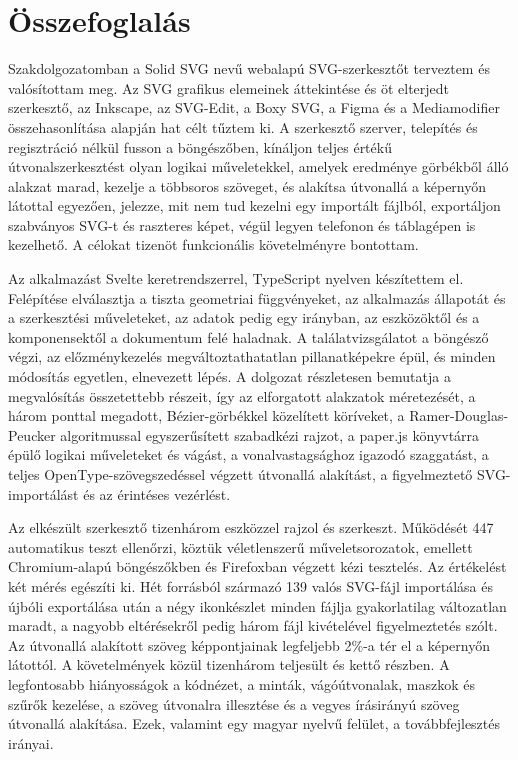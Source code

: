 \chapter{Összefoglalás}
\label{ch:summary}

Szakdolgozatomban a Solid SVG nevű webalapú SVG-szerkesztőt terveztem és valósítottam meg. Az SVG grafikus elemeinek áttekintése és öt elterjedt szerkesztő, az Inkscape, az SVG-Edit, a Boxy SVG, a Figma és a Mediamodifier összehasonlítása alapján hat célt tűztem ki. A szerkesztő szerver, telepítés és regisztráció nélkül fusson a böngészőben, kínáljon teljes értékű útvonalszerkesztést olyan logikai műveletekkel, amelyek eredménye görbékből álló alakzat marad, kezelje a többsoros szöveget, és alakítsa útvonallá a képernyőn látottal egyezően, jelezze, mit nem tud kezelni egy importált fájlból, exportáljon szabványos SVG-t és raszteres képet, végül legyen telefonon és táblagépen is kezelhető. A célokat tizenöt funkcionális követelményre bontottam.

Az alkalmazást Svelte keretrendszerrel, TypeScript nyelven készítettem el. Felépítése elválasztja a tiszta geometriai függvényeket, az alkalmazás állapotát és a szerkesztési műveleteket, az adatok pedig egy irányban, az eszközöktől és a komponensektől a dokumentum felé haladnak. A találatvizsgálatot a böngésző végzi, az előzménykezelés megváltoztathatatlan pillanatképekre épül, és minden módosítás egyetlen, elnevezett lépés. A dolgozat részletesen bemutatja a megvalósítás összetettebb részeit, így az elforgatott alakzatok méretezését, a három ponttal megadott, Bézier-görbékkel közelített köríveket, a Ramer-Douglas-Peucker algoritmussal egyszerűsített szabadkézi rajzot, a paper.js könyvtárra épülő logikai műveleteket és vágást, a vonalvastagsághoz igazodó szaggatást, a teljes OpenType-szövegszedéssel végzett útvonallá alakítást, a figyelmeztető SVG-importálást és az érintéses vezérlést.

Az elkészült szerkesztő tizenhárom eszközzel rajzol és szerkeszt. Működését 447 automatikus teszt ellenőrzi, köztük véletlenszerű műveletsorozatok, emellett Chromium-alapú böngészőkben és Firefoxban végzett kézi tesztelés. Az értékelést két mérés egészíti ki. Hét forrásból származó 139 valós SVG-fájl importálása és újbóli exportálása után a négy ikonkészlet minden fájlja gyakorlatilag változatlan maradt, a nagyobb eltérésekről pedig három fájl kivételével figyelmeztetés szólt. Az útvonallá alakított szöveg képpontjainak legfeljebb 2\%-a tér el a képernyőn látottól. A követelmények közül tizenhárom teljesült és kettő részben. A legfontosabb hiányosságok a kódnézet, a minták, vágóútvonalak, maszkok és szűrők kezelése, a szöveg útvonalra illesztése és a vegyes írásirányú szöveg útvonallá alakítása. Ezek, valamint egy magyar nyelvű felület, a továbbfejlesztés irányai.

